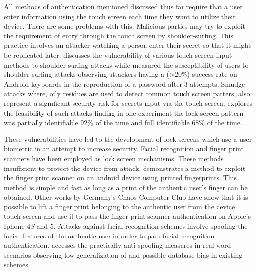 All methods of authentication mentioned discussed thus far
require that a user enter information using the touch screen
each time they want to utilize their device.
%
There are some problems with this.
Malicious parties may try to 
exploit the requirement of entry through the
touch screen by
shoulder-surfing.
This practice involves an attacker
watching a person enter their secret 
so that it might be replicated later.
%
\cite{schaub2012password} discusses the vulnerability of
various touch screen input methods to shoulder-surfing attacks
while
\cite{hafiz2008towards} measured the susceptibility of 
users to shoulder surfing attacks observing
attackers having a (\textgreater$20\%$) success rate
on Android keyboards
in the reproduction of a password after $3$ attempts.
%
Smudge attacks where,
oily residues are used to detect common touch screen patters,
also represent a significant security risk
for secrets input via the touch screen.
\cite{aviv2010smudge} explores the feasibility of
such attacks finding in one experiment
the lock screen pattern was partially identifiable $92\%$ of the time
and full identifiable $68\%$ of the time.

These vulnerabilities have led to the development of 
lock screens which 
use a user biometric in an attempt to increase security.
Facial recognition and finger print scanners have
been employed as lock screen mechanisms.
These methods insufficient to protect the device from attack.
%
\cite{cao2016hacking} demonstrates a method 
to exploit the finger print scanner on an android device
using printed fingerprints.
This method is simple and fast as long as a print of the
authentic user's finger can be obtained.
%
Other works by Germany's Chaos Computer Club \cite{CHAOS}
have show that it is possible to lift a finger print 
belonging to the authentic user from the device touch screen
and use it to pass the finger print scanner authentication on Apple's Iphone $4S$ and $5$. 
%
Attacks against facial recognition schemes involve
spoofing the facial features of the authentic user
in order to pass facial recognition authentication.
\cite{de2013can}
accesses the practically anti-spoofing measures in real word scenarios
observing 
low generalization of
and possible database bias in existing schemes.

